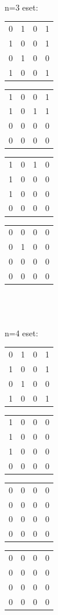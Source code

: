 \documentclass[paper=a4, fontsize=11pt]{article}
\begin{document}
\\
\\
\\
n=3 eset:
\begin{tabular}{cccc}
0&1&0&1\\
1&0&0&1\\
0&1&0&0\\
1&0&0&1
\end{tabular}
\quad
\begin{tabular}{cccc}
1&0&0&1\\
1&0&1&1\\
0&0&0&0\\
0&0&0&0
\end{tabular}
\quad
\begin{tabular}{cccc}
1&0&1&0\\
1&0&0&0\\
1&0&0&0\\
0&0&0&0
\end{tabular}
\quad
\begin{tabular}{cccc}
0&0&0&0\\
0&1&0&0\\
0&0&0&0\\
0&0&0&0
\end{tabular}
\\
\\
\\
n=4 eset:
\begin{tabular}{cccc}
0&1&0&1\\
1&0&0&1\\
0&1&0&0\\
1&0&0&1
\end{tabular}
\quad
\begin{tabular}{cccc}
1&0&0&0\\
1&0&0&0\\
1&0&0&0\\
0&0&0&0
\end{tabular}
\quad
\begin{tabular}{cccc}
0&0&0&0\\
0&0&0&0\\
0&0&0&0\\
0&0&0&0
\end{tabular}
\quad
\begin{tabular}{cccc}
0&0&0&0\\
0&0&0&0\\
0&0&0&0\\
0&0&0&0
\end{tabular}
\\
\\
\\
\end{document}

